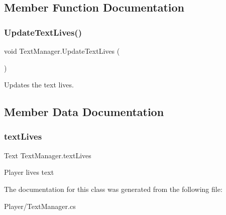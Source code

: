\subsection{Member Function Documentation}
\mbox{\label{class_text_manager_a3bbadf652b27afb331e85866cc2b46d4}} 
\subsubsection{\texorpdfstring{Update\+Text\+Lives()}{UpdateTextLives()}}
{\footnotesize\ttfamily void Text\+Manager.\+Update\+Text\+Lives (\begin{DoxyParamCaption}{ }\end{DoxyParamCaption})}



Updates the text lives. 



\subsection{Member Data Documentation}
\mbox{\label{class_text_manager_a8b12b74376f0b32cbef62f6b041e25f4}} 
\subsubsection{\texorpdfstring{text\+Lives}{textLives}}
{\footnotesize\ttfamily Text Text\+Manager.\+text\+Lives}



Player lives text 



The documentation for this class was generated from the following file\+:\begin{DoxyCompactItemize}
\item 
Player/Text\+Manager.\+cs\end{DoxyCompactItemize}
